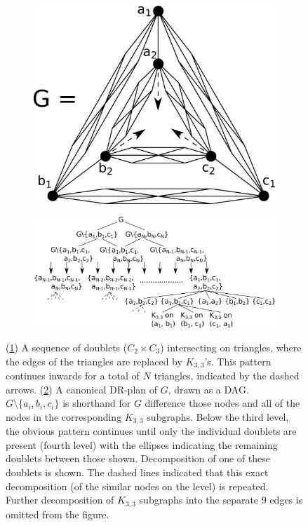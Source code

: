 \begin{figure}\centering%
    \begin{subfigure}{0.3\linewidth}\centering
        \includegraphics[height=\myMinHeight]{../../img/svg/revised_c2c3_of_k33s}
        \caption{}\label{fig:c2c3ofk33s:a}
    \end{subfigure}%
    \hfill
    \begin{subfigure}{0.7\linewidth}\centering
        \includegraphics[height=\myMinHeight]{../../img/svg/revised_c2c3_of_k33s_candrp}
        \caption{}\label{fig:c2c3ofk33s:b}
    \end{subfigure}%
    \caption{
    (\ref{fig:c2c3ofk33s:a}) A sequence of doublets ($C_2 \times C_3$) intersecting on triangles, where the edges of the triangles are replaced by $K_{3,3}$'s. This pattern continues inwards for a total of $N$ triangles, indicated by the dashed arrows. (\ref{fig:c2c3ofk33s:b}) A canonical DR-plan of $G$, drawn as a DAG. $G\setminus\{a_i,b_i,c_i\}$ is shorthand for $G$ difference those nodes and all of the nodes in the corresponding $K_{3,3}$ subgraphs. Below the third level, the obvious pattern continues until only the individual doublets are present (fourth level) with the ellipses indicating the remaining doublets between those shown. Decomposition of one of these doublets is shown. The dashed lines indicated that this exact decomposition (of the similar nodes on the level) is repeated. Further decomposition of $K_{3,3}$ subgraphs into the separate 9 edges is omitted from the figure.
    }
    \label{fig:c2c3ofk33s}
\end{figure}%




